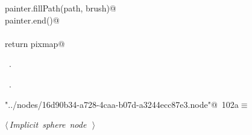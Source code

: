 \documentclass[
    a4paper,      %
    10pt,         %
    openright,    %
    notitlepage,  %
    parskip=half, %
]{scrreprt}       %
\theoremstyle{definition}                    %
\begin{document}
\begin{flushleft}
\begin{minipage}{\linewidth}
\begin{list}{}{}
\mbox{}\lstinline@    painter.fillPath(path, brush)@\\
\mbox{}\lstinline@    painter.end()@\\
\mbox{}\lstinline@@\\
\mbox{}\lstinline@    return pixmap@\\
\mbox{}\lstinline@@{\NWsep}
\end{list}
\vspace{-1.5ex}
\footnotesize
\begin{list}{}{\setlength{\itemsep}{-\parsep}\setlength{\itemindent}{-\leftmargin}}
\item \NWtxtMacroDefBy\ .
\item \NWtxtMacroRefIn\ .

\item{}
\end{list}
\end{minipage}\vspace{4ex}
\end{flushleft}
\begin{flushleft} \small
\begin{minipage}{\linewidth}\label{scrap164}\raggedright\small
{} \verb@"../nodes/16d90b34-a728-4caa-b07d-a3244ecc87e3.node"@\nobreak\ {\footnotesize {102a}}$\equiv$
\vspace{-1ex}
\begin{list}{}{} \item
\mbox{}\lstinline@@\hbox{$\langle\,${\itshape Implicit sphere node}\nobreak\ {\footnotesize {}}$\,\rangle$}\lstinline@@{\NWsep}
\end{list}
\vspace{-1.5ex}
\footnotesize
\begin{list}{}{\setlength{\itemsep}{-\parsep}\setlength{\itemindent}{-\leftmargin}}

\item{}
\end{list}
\end{minipage}\vspace{4ex}
\end{flushleft}
\end{document}
